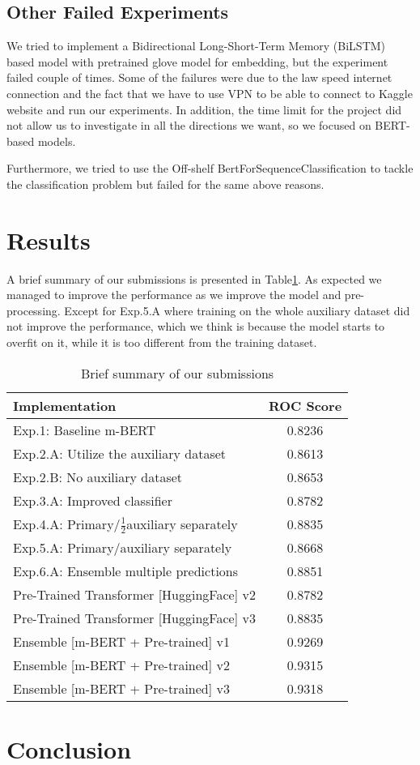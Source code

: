 \documentclass[10pt,twocolumn,letterpaper]{article}
\begin{document}
\subsection{Other Failed Experiments}
We tried to implement a Bidirectional Long-Short-Term Memory (BiLSTM) based model with pretrained glove model for embedding, but the experiment failed couple of times. Some of the failures were due to the law speed internet  connection and the fact that we have to use VPN to be able to connect to Kaggle website and run our experiments. In addition, the time limit for the project did not allow us to investigate in all the directions we want, so we focused on BERT-based models.

Furthermore, we tried to use the Off-shelf BertForSequenceClassification to tackle the classification problem but failed for the same above reasons.   

 
\section{Results}
A brief summary of our submissions is presented in Table\ref{ResultsSummary}. As expected we managed to improve the performance as we improve the model and pre-processing. Except for Exp.5.A where training on the whole auxiliary dataset did not  improve the performance, which we think is because the model starts to overfit on it, while it is too different from the training dataset. 

\begin{table}
\begin{center}
\begin{tabular}{|l|c|}
\hline
Implementation	& ROC Score \\
\hline\hline

Exp.1: Baseline m-BERT	& 0.8236    \\
Exp.2.A: Utilize the auxiliary dataset & 0.8613 \\
Exp.2.B: No auxiliary dataset	&0.8653 \\
Exp.3.A: Improved classifier & 0.8782 \\
Exp.4.A: Primary/$\frac{1}{2}$auxiliary separately & 0.8835 \\
Exp.5.A: Primary/auxiliary separately & 0.8668  \\
Exp.6.A: Ensemble multiple predictions & 0.8851 \\
Pre-Trained Transformer [HuggingFace] v2	&0.8782 \\
Pre-Trained Transformer [HuggingFace] v3	&0.8835  \\
Ensemble [m-BERT + Pre-trained] v1 	& 0.9269   \\
Ensemble [m-BERT + Pre-trained] v2 	& 0.9315   \\
Ensemble [m-BERT + Pre-trained] v3 	& 0.9318  \\

\hline
\end{tabular}
\end{center}
\caption{\label{ResultsSummary} Brief summary of our submissions}
\end{table}
\section{Conclusion}



{\small


}
\end{document}
